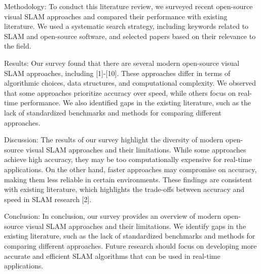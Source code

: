 \documentclass[conference]{IEEEtran}
\begin{document}
Methodology:
To conduct this literature review, we surveyed recent open-source visual SLAM approaches and compared their performance with existing literature. We used a systematic search strategy, including keywords related to SLAM and open-source software, and selected papers based on their relevance to the field.

Results:
Our survey found that there are several modern open-source visual SLAM approaches, including [1]-[10]. These approaches differ in terms of algorithmic choices, data structures, and computational complexity. We observed that some approaches prioritize accuracy over speed, while others focus on real-time performance. We also identified gaps in the existing literature, such as the lack of standardized benchmarks and methods for comparing different approaches.

Discussion:
The results of our survey highlight the diversity of modern open-source visual SLAM approaches and their limitations. While some approaches achieve high accuracy, they may be too computationally expensive for real-time applications. On the other hand, faster approaches may compromise on accuracy, making them less reliable in certain environments. These findings are consistent with existing literature, which highlights the trade-offs between accuracy and speed in SLAM research [2].

Conclusion:
In conclusion, our survey provides an overview of modern open-source visual SLAM approaches and their limitations. We identify gaps in the existing literature, such as the lack of standardized benchmarks and methods for comparing different approaches. Future research should focus on developing more accurate and efficient SLAM algorithms that can be used in real-time applications.
\end{document}
